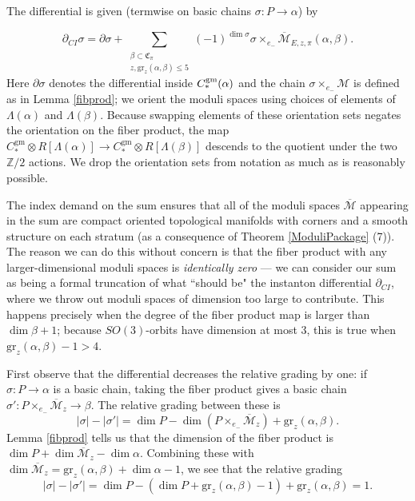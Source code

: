 \documentclass[10pt,a4paper]{amsart}
\theoremstyle{definition}
\theoremstyle{remark}
\numberwithin{figure}{qchap}
\begin{document}
The differential is given (termwise on basic chains $\sigma: P \to \alpha$) by

$$\partial_{CI} \sigma = \partial \sigma + \sum_{\substack{\beta \subset \mathfrak C_\pi\\z, \text{gr}_z(\alpha, \beta) \leq 5}} (-1)^{\dim \sigma} \sigma \times_{e_-} \overline{\mathcal M}_{E,z,\pi}(\alpha, \beta).$$ 
Here $\partial \sigma$ denotes the differential inside $C_*^{\textup{gm}}(\alpha)$ and the chain $\sigma \times_{e_-} \mathcal M$ is defined as in Lemma \ref{fibprod}; we orient the moduli spaces using choices of elements of $\Lambda(\alpha)$ and $\Lambda(\beta)$. Because swapping elements of these orientation sets negates the orientation on the fiber product, the map $C_*^{\text{gm}} \otimes R[\Lambda(\alpha)] \to C_*^{\text{gm}} \otimes R[\Lambda(\beta)]$ descends to the quotient under the two $\mathbb Z/2$ actions. We drop the orientation sets from notation as much as is reasonably possible.

The index demand on the sum ensures that all of the moduli spaces $\overline{\mathcal M}$ appearing in the sum are compact oriented topological manifolds with corners and a smooth structure on each stratum (as a consequence of Theorem \ref{ModuliPackage} (7)). The reason we can do this without concern is that the fiber product with any larger-dimensional moduli spaces is \textit{identically zero} --- we can consider our sum as being a formal truncation of what ``should be" the instanton differential $\partial_{CI}$, where we throw out moduli spaces of dimension too large to contribute. This happens precisely when the degree of the fiber product map is larger than $\dim \beta + 1$; because $SO(3)$-orbits have dimension at most 3, this is true when $\text{gr}_z(\alpha, \beta) -1 > 4$.

First observe that the differential decreases the relative grading by one: if $\sigma: P \to \alpha$ is a basic chain, taking the fiber product gives a basic chain $\sigma': P \times_{e_-} \overline{\mathcal M}_z \to \beta$. The relative grading between these is $$|\sigma| - |\sigma'| = \dim P - \dim \left(P \times_{e_-} \overline{\mathcal M}_z\right) + \text{gr}_z(\alpha, \beta).$$ Lemma \ref{fibprod} tells us that the dimension of the fiber product is $\dim P + \dim \overline{\mathcal M}_z - \dim \alpha$. Combining these with $\dim \overline{\mathcal M}_z = \text{gr}_z(\alpha, \beta) + \dim \alpha - 1$, we see that the relative grading $$|\sigma| - |\sigma'| = \dim P - (\dim P + \text{gr}_z(\alpha, \beta) - 1) + \text{gr}_z(\alpha, \beta) = 1.$$
\end{document}
